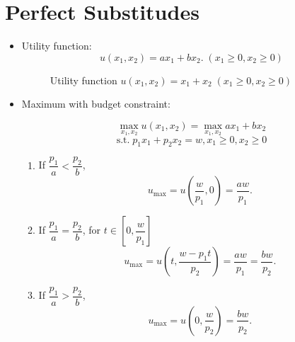 \documentclass[
12pt, %
a4paper, %
onecolumn, %
portrait %
]{article}
\begin{document}
\section{Perfect Substitudes} %
\begin{itemize}
\item Utility function:
	\[
	u(x_1,x_2)=ax_1+bx_2.\;(x_1\ge0,x_2\ge 0)
	\]
\begin{figure}[H]
	\centering
	\caption{Utility function $u(x_1,x_2)=x_1+x_2\;(x_1\ge0,x_2\ge 0)$}
	\label{Fig.lable}
\end{figure}	


\item Maximum with budget constraint:
    
    \[
    \max_{x_1,x_2} u(x_1,x_2)=\max_{x_1,x_2}ax_1+bx_2
    \]
    \[
    \text{s.t.}\;p_1x_1+p_2x_2=w,x_1\ge0,x_2\ge 0
    \]
    \begin{enumerate}
    \item If $\dfrac{p_1}{a}<\dfrac{p_2}{b}$,
    \[
    u_{\max}=u\left(\frac{w}{p_1},0\right)=\frac{aw}{p_1}.
    \]
    \item If $\dfrac{p_1}{a}=\dfrac{p_2}{b}$, for $t\in\left[0,\dfrac{w}{p_1}\right]$
    \[
    u_{\max}=u\left(t,\frac{w-p_1t}{p_2}\right)=\frac{aw}{p_1}=\frac{bw}{p_2}.
    \]
    \item If $\dfrac{p_1}{a}>\dfrac{p_2}{b}$,
    \[
    u_{\max}=u\left(0,\frac{w}{p_2}\right)=\frac{bw}{p_2}.
    \]
    \end{enumerate}


\end{itemize}
\end{document}
